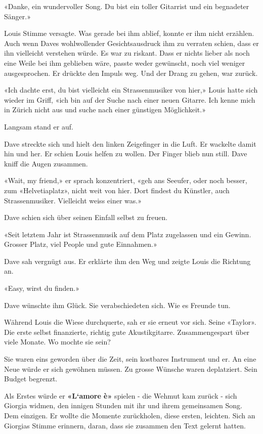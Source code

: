 «Danke, ein wundervoller Song. Du bist ein toller Gitarrist und ein
begnadeter Sänger.»

Louis Stimme versagte. Was gerade bei ihm ablief, konnte er ihm nicht
erzählen. Auch wenn Daves wohlwollender Gesichtsausdruck ihm zu verraten
schien, dass er ihn vielleicht verstehen würde. Es war zu riskant. Dass
er nichts lieber als noch eine Weile bei ihm geblieben wäre, passte
weder gewünscht, noch viel weniger ausgesprochen. Er drückte den Impuls
weg. Und der Drang zu gehen, war zurück.

«Ich dachte erst, du bist vielleicht ein Strassenmusiker von hier,»
Louis hatte sich wieder im Griff, «ich bin auf der Suche nach einer
neuen Gitarre. Ich kenne mich in Zürich nicht aus und suche nach einer
günstigen Möglichkeit.»

Langsam stand er auf.

Dave streckte sich und hielt den linken Zeigefinger in die Luft. Er
wackelte damit hin und her. Er schien Louis helfen zu wollen. Der Finger
blieb nun still. Dave kniff die Augen zusammen.

«Wait, my friend,» er sprach konzentriert, «geh ans Seeufer, oder noch
besser, zum «Helvetiaplatz», nicht weit von hier. Dort findest du
Künstler, auch Strassenmusiker. Vielleicht weiss einer was.»

Dave schien sich über seinen Einfall selbst zu freuen.

«Seit letztem Jahr ist Strassenmusik auf dem Platz zugelassen und ein
Gewinn. Grosser Platz, viel People und gute Einnahmen.»

Dave sah vergnügt aus. Er erklärte ihm den Weg und zeigte Louis die
Richtung an.

«Easy, wirst du finden.»

Dave wünschte ihm Glück. Sie verabschiedeten sich. Wie es Freunde tun.

Während Louis die Wiese durchquerte, sah er sie erneut vor sich. Seine
«Taylor». Die erste selbst finanzierte, richtig gute Akustikgitarre.
Zusammengespart über viele Monate. Wo mochte sie sein?

Sie waren eins geworden über die Zeit, sein kostbares Instrument und er.
An eine Neue würde er sich gewöhnen müssen. Zu grosse Wünsche waren
deplatziert. Sein Budget begrenzt.

Als Erstes würde er \textbf{«L`amore è»} spielen - die Wehmut kam zurück
- sich Giorgia widmen, den innigen Stunden mit ihr und ihrem gemeinsamen
Song. Dem einzigen. Er wollte die Momente zurückholen, diese ersten,
leichten. Sich an Giorgias Stimme erinnern, daran, dass sie zusammen den
Text gelernt hatten.

